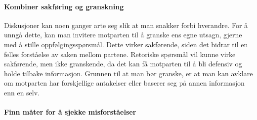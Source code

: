 \paragraph{Kombiner sakføring og granskning}
Diskusjoner kan noen ganger arte seg slik at man snakker forbi hverandre.
For å unngå dette, kan man invitere motparten til å granske ens egne utsagn, gjerne med å stille oppfølgingsspørsmål.
Dette virker sakførende, siden det bidrar til en felles forståelse av saken mellom partene.
Retoriske spørsmål vil kunne virke sakførende, men ikke granskende, da det kan få motparten til å bli defensiv og holde tilbake informasjon.
Grunnen til at man bør granske, er at man kan avklare om motparten har forskjellige antakelser eller baserer seg på annen informasjon enn en selv.

\paragraph{Finn måter for å sjekke misforståelser}



